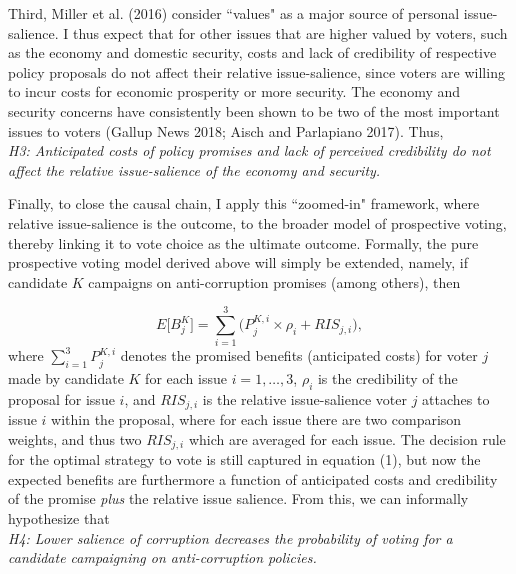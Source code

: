\documentclass[11pt]{article}
\begin{document}
Third, Miller et al. (2016) consider “values" as a major source of personal issue-salience. I thus expect that for other issues that are higher valued by voters, such as the economy and domestic security, costs and lack of credibility of respective policy proposals do not affect their relative issue-salience, since voters are willing to incur costs for economic prosperity or more security. The economy and security concerns have consistently been shown to be two of the most important issues to voters (Gallup News 2018; Aisch and Parlapiano 2017). Thus, \\
\textit{H3: Anticipated costs of policy promises and lack of perceived credibility do not affect the relative issue-salience of the economy and security.}

Finally, to close the causal chain, I apply this “zoomed-in" framework, where relative issue-salience is the outcome, to the broader model of prospective voting, thereby linking it to vote choice as the ultimate outcome. Formally, the pure prospective voting model derived above will simply be extended, namely, if candidate $K$ campaigns on anti-corruption promises (among others), then

\begin{equation}
E\Big[B_j^K\Big] = \sum_{i = 1}^{3}\bigg(P_j^{K, i} \times \rho_i + RIS_{j,i}\bigg),
\end{equation}
where $\sum_{i = 1}^{3}P_j^{K, i}$ denotes the promised benefits (anticipated costs) for voter $j$ made by candidate $K$ for each issue $i = 1, \hdots, 3$, $\rho_i$ is the credibility of the proposal for issue $i$, and $RIS_{j,i}$ is the relative issue-salience voter $j$ attaches to issue $i$ within the proposal, where for each issue there are two comparison weights, and thus two $RIS_{j,i}$ which are averaged for each issue. The decision rule for the optimal strategy to vote is still captured in equation (1), but now the expected benefits are furthermore a function of anticipated costs and credibility of the promise \textit{plus} the relative issue salience. From this, we can informally hypothesize that \\
\textit{H4: Lower salience of corruption decreases the probability of voting for a candidate campaigning on anti-corruption policies.} \\
\end{document}
